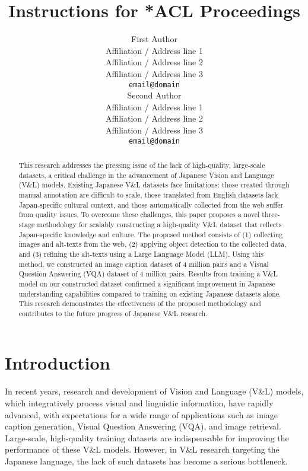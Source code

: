 \documentclass[11pt]{article}
\title{Instructions for *ACL Proceedings}
\author{First Author \\
  Affiliation / Address line 1 \\
  Affiliation / Address line 2 \\
  Affiliation / Address line 3 \\
  \texttt{email@domain} \\\And
  Second Author \\
  Affiliation / Address line 1 \\
  Affiliation / Address line 2 \\
  Affiliation / Address line 3 \\
  \texttt{email@domain} \\}
\begin{document}
\maketitle
\begin{abstract}
  This research addresses the pressing issue of the lack of high-quality, large-scale datasets, a critical challenge in the advancement of Japanese Vision and Language (V\&L) models. Existing Japanese V\&L datasets face limitations: those created through manual annotation are difficult to scale, those translated from English datasets lack Japan-specific cultural context, and those automatically collected from the web suffer from quality issues. To overcome these challenges, this paper proposes a novel three-stage methodology for scalably constructing a high-quality V\&L dataset that reflects Japan-specific knowledge and culture. The proposed method consists of (1) collecting images and alt-texts from the web, (2) applying object detection to the collected data, and (3) refining the alt-texts using a Large Language Model (LLM). Using this method, we constructed an image caption dataset of 4 million pairs and a Visual Question Answering (VQA) dataset of 4 million pairs. Results from training a V\&L model on our constructed dataset confirmed a significant improvement in Japanese understanding capabilities compared to training on existing Japanese datasets alone. This research demonstrates the effectiveness of the proposed methodology and contributes to the future progress of Japanese V\&L research.
\end{abstract}

\section{Introduction}

In recent years, research and development of Vision and Language (V\&L) models, which integratively process visual and linguistic information, have rapidly advanced, with expectations for a wide range of applications such as image caption generation, Visual Question Answering (VQA), and image retrieval. Large-scale, high-quality training datasets are indispensable for improving the performance of these V\&L models. However, in V\&L research targeting the Japanese language, the lack of such datasets has become a serious bottleneck.
\end{document}
